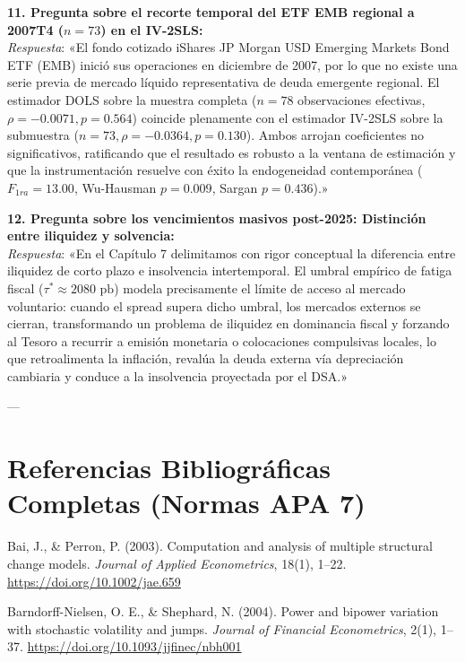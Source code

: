 \documentclass[11pt,a4paper]{article}
\begin{document}
\begin{mdframed}[style=infobox]
\vspace{0.2cm}
\textbf{11. Pregunta sobre el recorte temporal del ETF EMB regional a 2007T4 ($n=73$) en el IV-2SLS:}\\
\textit{Respuesta}: «El fondo cotizado iShares JP Morgan USD Emerging Markets Bond ETF (EMB) inició sus operaciones en diciembre de 2007, por lo que no existe una serie previa de mercado líquido representativa de deuda emergente regional. El estimador DOLS sobre la muestra completa ($n=78$ observaciones efectivas, $\rho = -0.0071, p=0.564$) coincide plenamente con el estimador IV-2SLS sobre la submuestra ($n=73, \rho = -0.0364, p=0.130$). Ambos arrojan coeficientes no significativos, ratificando que el resultado es robusto a la ventana de estimación y que la instrumentación resuelve con éxito la endogeneidad contemporánea ($F_{1ra} = 13.00$, Wu-Hausman $p=0.009$, Sargan $p=0.436$).»

\vspace{0.2cm}
\textbf{12. Pregunta sobre los vencimientos masivos post-2025: Distinción entre iliquidez y solvencia:}\\
\textit{Respuesta}: «En el Capítulo 7 delimitamos con rigor conceptual la diferencia entre iliquidez de corto plazo e insolvencia intertemporal. El umbral empírico de fatiga fiscal ($\tau^* \approx 2080\text{ pb}$) modela precisamente el límite de acceso al mercado voluntario: cuando el spread supera dicho umbral, los mercados externos se cierran, transformando un problema de iliquidez en dominancia fiscal y forzando al Tesoro a recurrir a emisión monetaria o colocaciones compulsivas locales, lo que retroalimenta la inflación, revalúa la deuda externa vía depreciación cambiaria y conduce a la insolvencia proyectada por el DSA.»
\end{mdframed}

---

\section{Referencias Bibliográficas Completas (Normas APA 7)}

\noindent
\begingroup
\setlength{\parindent}{-1.27cm}
\setlength{\leftskip}{1.27cm}
\setlength{\parskip}{0.6\baselineskip}

Bai, J., \& Perron, P. (2003). Computation and analysis of multiple structural change models. \textit{Journal of Applied Econometrics}, 18(1), 1--22. \url{https://doi.org/10.1002/jae.659}

Barndorff-Nielsen, O. E., \& Shephard, N. (2004). Power and bipower variation with stochastic volatility and jumps. \textit{Journal of Financial Econometrics}, 2(1), 1--37. \url{https://doi.org/10.1093/jjfinec/nbh001}
\end{document}
